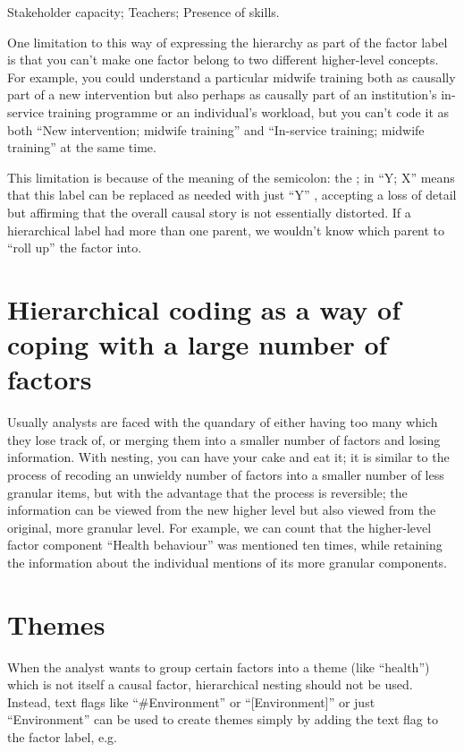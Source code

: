 \documentclass[
]{book}
\begin{document}
Stakeholder capacity; Teachers; Presence of skills.

One limitation to this way of expressing the hierarchy as part of the factor label is that you can't make one factor belong to two different higher-level concepts. For example, you could understand a particular midwife training both as causally part of a new intervention but also perhaps as causally part of an institution's in-service training programme or an individual's workload, but you can't code it as both ``New intervention; midwife training'' and ``In-service training; midwife training'' at the same time.

This limitation is because of the meaning of the semicolon: the ; in ``Y; X'' means that this label can be replaced as needed with just ``Y'' , accepting a loss of detail but affirming that the overall causal story is not essentially distorted. If a hierarchical label had more than one parent, we wouldn't know which parent to ``roll up'' the factor into.

\hypertarget{hierarchical-coding-as-a-way-of-coping-with-a-large-number-of-factors}{%
\section{Hierarchical coding as a way of coping with a large number of factors}\label{hierarchical-coding-as-a-way-of-coping-with-a-large-number-of-factors}}

Usually analysts are faced with the quandary of either having too many which they lose track of, or merging them into a smaller number of factors and losing information. With nesting, you can have your cake and eat it; it is similar to the process of recoding an unwieldy number of factors into a smaller number of less granular items, but with the advantage that the process is reversible; the information can be viewed from the new higher level but also viewed from the original, more granular level. For example, we can count that the higher-level factor component ``Health behaviour'' was mentioned ten times, while retaining the information about the individual mentions of its more granular components.

\hypertarget{themes}{%
\section{Themes}\label{themes}}

When the analyst wants to group certain factors into a theme (like ``health'') which is not itself a causal factor, hierarchical nesting should not be used. Instead, text flags like ``\#Environment'' or ``{[}Environment{]}'' or just ``Environment'' can be used to create themes simply by adding the text flag to the factor label, e.g.~
\end{document}
